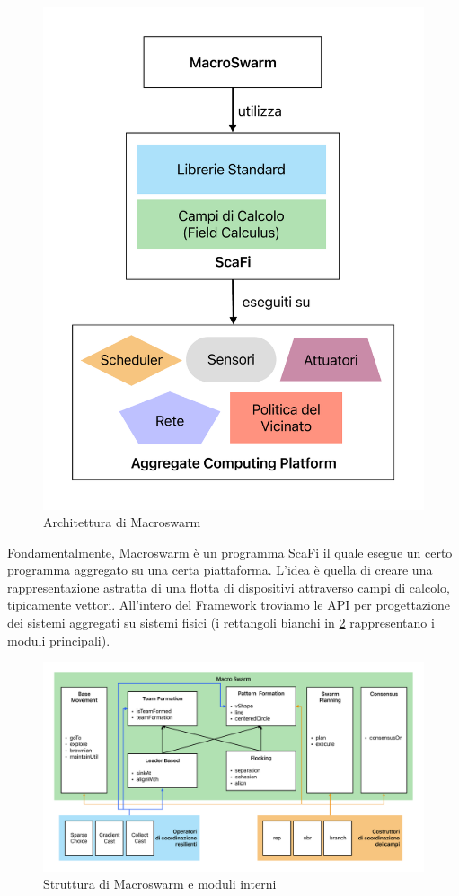 \documentclass[12pt,a4paper,openright,twoside]{book}
\begin{document}
\begin{figure}
    \centering
    \includegraphics[width=.8\linewidth]{figures/macroSwarm-arc.pdf}
    \caption{Architettura di Macroswarm}
    \label{fig:macro-swarm-arc}
\end{figure}

Fondamentalmente, Macroswarm è un programma ScaFi il quale esegue un certo programma aggregato su una certa piattaforma. L'idea è quella di creare una rappresentazione astratta di una flotta di dispositivi attraverso campi di calcolo, tipicamente vettori.
All'intero del Framework troviamo le API per progettazione dei sistemi aggregati su sistemi fisici (i rettangoli bianchi in \cref{fig:macro-swarm-int} rappresentano i moduli principali).

\begin{figure}
    \centering
    \includegraphics[width=.99\linewidth]{figures/macroSwarm-modeles.pdf}
    \caption{Struttura di Macroswarm e moduli interni}
    \label{fig:macro-swarm-int}
\end{figure}
\end{document}
